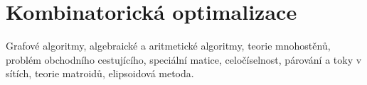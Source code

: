 \newpage
\section{Kombinatorická optimalizace}
\begin{pozadavky}
\begin{pitemize}
\item Grafové algoritmy, algebraické a aritmetické algoritmy, teorie mnohostěnů, problém obchodního cestujícího, speciální matice, celočíselnost, párování a toky v sítích, teorie matroidů, elipsoidová metoda.
\end{pitemize}
\end{pozadavky}